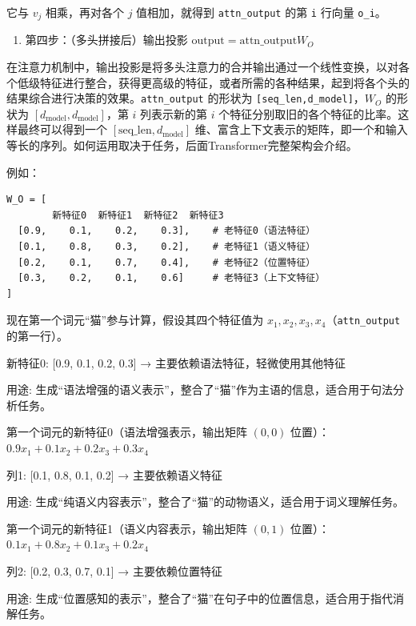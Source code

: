 它与 \(v_j\) 相乘，再对各个 \(j\) 值相加，就得到 \texttt{attn\_output} 的第 \texttt{i} 行向量 \texttt{o\_i}。

\begin{enumerate}
\def\labelenumi{\arabic{enumi}.}
\setcounter{enumi}{3}
\tightlist
\item
  第四步：（多头拼接后）输出投影 \(\mathrm{output}=\mathrm{attn\_output}W_O\)
\end{enumerate}

在注意力机制中，输出投影是将多头注意力的合并输出通过一个线性变换，以对各个低级特征进行整合，获得更高级的特征，或者所需的各种结果，起到将各个头的结果综合进行决策的效果。\texttt{attn\_output} 的形状为 \texttt{{[}seq\_len,d\_model{]}}，\(W_O\) 的形状为 \([d_{\mathrm{model}},d_{\mathrm{model}}]\)，第 \(i\) 列表示新的第 \(i\) 个特征分别取旧的各个特征的比率。这样最终可以得到一个 \([\mathrm{seq\_len},d_{\mathrm{model}}]\) 维、富含上下文表示的矩阵，即一个和输入等长的序列。如何运用取决于任务，后面Transformer完整架构会介绍。

例如：

\begin{verbatim}
W_O = [
        新特征0  新特征1  新特征2  新特征3
  [0.9,    0.1,    0.2,    0.3],    # 老特征0（语法特征）
  [0.1,    0.8,    0.3,    0.2],    # 老特征1（语义特征）
  [0.2,    0.1,    0.7,    0.4],    # 老特征2（位置特征）
  [0.3,    0.2,    0.1,    0.6]     # 老特征3（上下文特征）
]
\end{verbatim}

现在第一个词元``猫''参与计算，假设其四个特征值为 \(x_1,x_2,x_3,x_4\)（\texttt{attn\_output} 的第一行）。

新特征0: {[}0.9, 0.1, 0.2, 0.3{]} → 主要依赖语法特征，轻微使用其他特征

用途: 生成``语法增强的语义表示''，整合了``猫''作为主语的信息，适合用于句法分析任务。

第一个词元的新特征0（语法增强表示，输出矩阵 \((0,0)\) 位置）：\(0.9x_1+0.1x_2+0.2x_3+0.3x_4\)

列1: {[}0.1, 0.8, 0.1, 0.2{]} → 主要依赖语义特征

用途: 生成``纯语义内容表示''，整合了``猫''的动物语义，适合用于词义理解任务。

第一个词元的新特征1（语义内容表示，输出矩阵 \((0,1)\) 位置）：\(0.1x_1+0.8x_2+0.1x_3+0.2x_4\)

列2: {[}0.2, 0.3, 0.7, 0.1{]} → 主要依赖位置特征

用途: 生成``位置感知的表示''，整合了``猫''在句子中的位置信息，适合用于指代消解任务。

